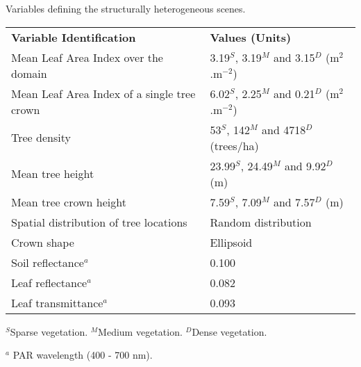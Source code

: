 \documentclass[a4paper,11pt]{report}
\begin{document}
\begin{threeparttable}
\centering
\caption{Variables defining the structurally heterogeneous scenes.}
\begin{tabular}{l{} l{}}
     \hline
     \hline
\textbf{Variable Identification}   & \textbf{Values (Units)}\\
\noalign{\smallskip}\hline
Mean Leaf Area Index over the domain         &	3.19$^S$, 3.19$^M$ and 3.15$^D$ (m$^2$.m$^{-2}$)\\
Mean Leaf Area Index of a single tree crown  &	6.02$^S$, 2.25$^M$ and 0.21$^D$ (m$^2$.m$^{-2}$)\\
Tree density 	                             & 53$^S$, 142$^M$ and 4718$^D$ (trees/ha)\\
Mean tree height	                     &23.99$^S$, 24.49$^M$ and 9.92$^D$ (m)\\
Mean tree crown height	                     &7.59$^S$, 7.09$^M$ and 7.57$^D$ (m)\\
Spatial distribution of tree locations	     & Random distribution\\
Crown shape	                             & Ellipsoid\\
Soil reflectance$^a$	                     & 0.100\\
Leaf reflectance$^a$	                     & 0.082\\
Leaf transmittance$^a$ 	                     & 0.093\\
\hline
\hline%
\end{tabular}
\begin{tablenotes}
      \small
      \item $^S$Sparse vegetation. $^M$Medium vegetation. $^D$Dense vegetation. 
      \item $^a$ PAR wavelength (400 - 700 nm). 
\end{tablenotes}
\label{tab:parameters_laisense}
\end{threeparttable}
\end{document}
